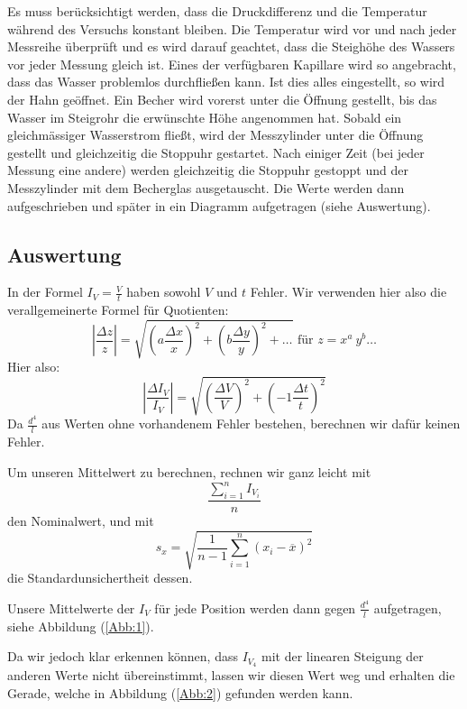 \documentclass[11pt,a4paper]{article}
\begin{document}
Es muss berücksichtigt werden, dass die Druckdifferenz und die Temperatur während des Versuchs konstant bleiben. Die Temperatur wird vor und nach jeder Messreihe überprüft und es wird darauf geachtet, dass die Steighöhe des Wassers vor jeder Messung gleich ist. Eines der verfügbaren Kapillare wird so angebracht, dass das Wasser problemlos durchflie\ss en kann. Ist dies alles eingestellt, so wird der Hahn geöffnet. Ein Becher wird vorerst unter die Öffnung gestellt, bis das Wasser im Steigrohr die erwünschte Höhe angenommen hat. Sobald ein gleichmässiger Wasserstrom fließt, wird der Messzylinder unter die Öffnung gestellt und gleichzeitig die Stoppuhr gestartet. Nach einiger Zeit (bei jeder Messung eine andere) werden gleichzeitig die Stoppuhr gestoppt und der Messzylinder mit dem Becherglas ausgetauscht. Die Werte werden dann aufgeschrieben und sp\"ater in ein Diagramm aufgetragen (siehe Auswertung).

\subsection{Auswertung}

In der Formel $I_V=\frac{V}{t}$ haben sowohl $V$ und $t$ Fehler. Wir verwenden hier also die verallgemeinerte Formel f\"ur Quotienten:
$$
\left\vert\frac{\Delta z}{z}\right\vert=\sqrt{\left(a\frac{\Delta x}{x}\right)^2+\left(b\frac{\Delta y}{y}\right)^2+\ldots}\textrm{ f\"ur }z=x^a\ y^b\ldots
$$
Hier also:
$$
\left\vert\frac{\Delta I_V}{I_V}\right\vert=\sqrt{\left(\frac{\Delta V}{V}\right)^2+\left(-1\frac{\Delta t}{t}\right)^2}
$$
Da $\frac{d^4}{l}$ aus Werten ohne vorhandenem Fehler bestehen, berechnen wir daf\"ur keinen Fehler.

Um unseren Mittelwert zu berechnen, rechnen wir ganz leicht mit 
\begin{equation}
\frac{\sum_{i=1}^n I_{V_i}}{n}\label{mean}
\end{equation}
den Nominalwert, und mit
\begin{equation}
s_x=\sqrt{\frac{1}{n-1}\sum_{i=1}^n(x_i-\overline{x})^2}\label{meanstd}
\end{equation}
die Standardunsichertheit dessen.

Unsere Mittelwerte der $I_V$ f\"ur jede Position werden dann gegen $\frac{d^4}{l}$ aufgetragen, siehe Abbildung (\ref{Abb:1}).

Da wir jedoch klar erkennen k\"onnen, dass $I_{V_4}$ mit der linearen Steigung der anderen Werte nicht \"ubereinstimmt, lassen wir diesen Wert weg und erhalten die Gerade, welche in Abbildung (\ref{Abb:2}) gefunden werden kann.
\end{document}
